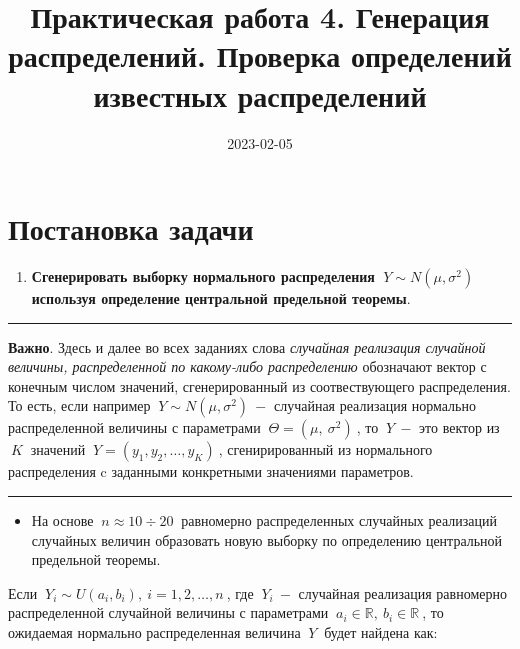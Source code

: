 \documentclass[
]{article}
\title{Практическая работа 4. Генерация распределений. Проверка
определений известных распределений}
\author{}
\date{\vspace{-2.5em}2023-02-05}
\providecommand{\tightlist}{%
  \setlength{\itemsep}{0pt}\setlength{\parskip}{0pt}}
\begin{document}
\maketitle

\hypertarget{ux43fux43eux441ux442ux430ux43dux43eux432ux43aux430-ux437ux430ux434ux430ux447ux438}{%
\section{\texorpdfstring{\textbf{Постановка
задачи}}{Постановка задачи}}\label{ux43fux43eux441ux442ux430ux43dux43eux432ux43aux430-ux437ux430ux434ux430ux447ux438}}

\begin{enumerate}
\def\labelenumi{\arabic{enumi}.}
\tightlist
\item
  \textbf{Сгенерировать выборку нормального распределения
  \(\ Y \sim N(\mu, \sigma^2)\ \) используя определение центральной
  предельной теоремы}.
\end{enumerate}

\begin{center}\rule{0.5\linewidth}{0.5pt}\end{center}

\textbf{Важно}. Здесь и далее во всех заданиях слова \emph{случайная
реализация случайной величины, распределенной по какому-либо
распределению} обозначают вектор с конечным числом значений,
сгенерированный из соотвествующего распределения. То есть, если например
\(\ Y \sim N\left(\mu, \sigma^2\right) \ -\) случайная реализация
нормально распределенной величины с параметрами
\(\ \Theta = (\mu,\ \sigma^2)\ \), то \(\ Y\ -\) это вектор из \(\ K\ \)
значений \(\ Y = (y_1, y_2, \dots, y_K)\ \), сгенирированный из
нормального распределения c заданными конкретными значениями параметров.

\begin{center}\rule{0.5\linewidth}{0.5pt}\end{center}

\begin{itemize}
\tightlist
\item
  На основе \(\ n \approx 10\div 20\ \) равномерно распределенных
  случайных реализаций случайных величин образовать новую выборку по
  определению центральной предельной теоремы.
\end{itemize}

Если \(\ Y_{i} \sim U(a_i, b_i), \ i = 1, 2, \dots, n\ \), где
\(\ Y_{i}\ -\) случайная реализация равномерно распределенной случайной
величины с параметрами \(\ a_i \in \mathbb{R},\ b_i \in \mathbb{R}\ \),
то ожидаемая нормально распределенная величина \(\ Y\ \) будет найдена
как:
\end{document}
